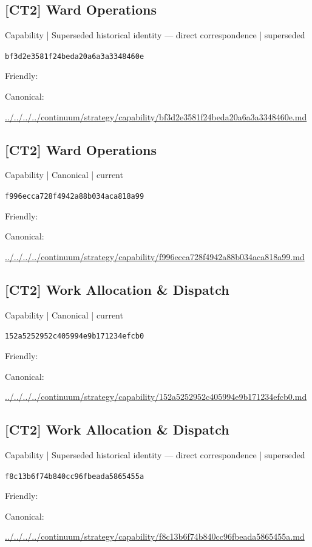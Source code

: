\documentclass[10pt,a4paper]{article}
\begin{document}
\subsection*{[CT2] Ward Operations}
{\small Capability | Superseded historical identity — direct correspondence | superseded}\par
\texttt{bf3d2e3581f24beda20a6a3a3348460e}\par
Friendly: \par
Canonical: \par
{\footnotesize\url{../../../../continuum/strategy/capability/bf3d2e3581f24beda20a6a3a3348460e.md}}\par
\subsection*{[CT2] Ward Operations}
{\small Capability | Canonical | current}\par
\texttt{f996ecca728f4942a88b034aca818a99}\par
Friendly: \par
Canonical: \par
{\footnotesize\url{../../../../continuum/strategy/capability/f996ecca728f4942a88b034aca818a99.md}}\par
\subsection*{[CT2] Work Allocation \& Dispatch}
{\small Capability | Canonical | current}\par
\texttt{152a5252952c405994e9b171234efcb0}\par
Friendly: \par
Canonical: \par
{\footnotesize\url{../../../../continuum/strategy/capability/152a5252952c405994e9b171234efcb0.md}}\par
\subsection*{[CT2] Work Allocation \& Dispatch}
{\small Capability | Superseded historical identity — direct correspondence | superseded}\par
\texttt{f8c13b6f74b840cc96fbeada5865455a}\par
Friendly: \par
Canonical: \par
{\footnotesize\url{../../../../continuum/strategy/capability/f8c13b6f74b840cc96fbeada5865455a.md}}\par
\end{document}
